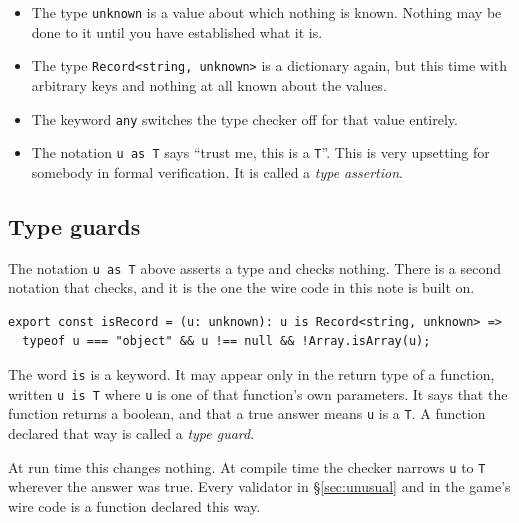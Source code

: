 \documentclass[11pt,a4paper]{article}
\begin{document}
\begin{listbox}
\begin{itemize}\setlength{\itemsep}{2pt}

\item The type \texttt{unknown} is a value about which nothing is known. Nothing may be done to
      it until you have established what it is.

\item The type \texttt{Record<string, unknown>} is a dictionary again, but this time with
      arbitrary keys and nothing at all known about the values.

\item The keyword \texttt{any} switches the type checker off for that value entirely.

\item The notation \texttt{u as T} says ``trust me, this is a \texttt{T}''. This is very
      upsetting for somebody in formal verification. It is called a \emph{type assertion}.

\end{itemize}
\end{listbox}

\newpage

\subsection{Type guards}
\label{sec:guards}

The notation \texttt{u as T} above asserts a type and checks nothing. There is a second notation
that checks, and it is the one the wire code in this note is built on.

\begin{lstlisting}[language=TS]
export const isRecord = (u: unknown): u is Record<string, unknown> =>
  typeof u === "object" && u !== null && !Array.isArray(u);
\end{lstlisting}

The word \texttt{is} is a keyword. It may appear only in the return type of a function, written
\texttt{u is T} where \texttt{u} is one of that function's own parameters. It says that the function
returns a boolean, and that a true answer means \texttt{u} is a \texttt{T}. A function declared that
way is called a \emph{type guard}.

At run time this changes nothing. At compile time the checker narrows \texttt{u} to \texttt{T}
wherever the answer was true. Every validator in \S\ref{sec:unusual} and in the
game's wire code is a function declared this way.
\end{document}
